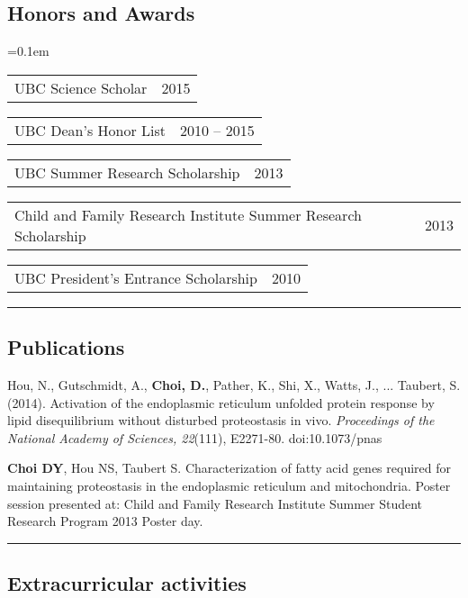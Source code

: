 \documentclass[10pt,letterpaper]{article}
\makeatletter
\newenvironment{indentsection}[1]%
{\begin{list}{}%
	{\setlength{\leftmargin}{#1}}%
	\item[]%
}
{\end{list}}
\newcommand{\headerrow}[2]
{\begin{tabular*}{\linewidth}{l@{\extracolsep{\fill}}r}
	#1 &
	#2 \\
\end{tabular*}}
\makeatother
\begin{document}
\subsection*{Honors and Awards}

\begin{itemize*}
	\parskip=0.1em
	\item 
	\headerrow
		{{UBC Science Scholar}}
		{{2015}}
	\item 
	\headerrow
		{{UBC Dean's Honor List}}
		{{2010 -- 2015}}
	\item 
	\headerrow
		{{UBC Summer Research Scholarship}}
		{{2013}}
	\item 
	\headerrow
		{{Child and Family Research Institute Summer Research Scholarship}}
		{{2013}}
	\item 
	\headerrow
		{{UBC President's Entrance Scholarship}}
		{{2010}}
\end{itemize*}


\hrule
\vspace{-0.4em}

\subsection*{Publications}

\begin{indentsection}{\parindent}
\begin{description*}
	\item
	Hou, N., Gutschmidt, A., \textbf{Choi, D.}, Pather, K., Shi, X., Watts, J., ... Taubert, S. 
	(2014). Activation of the endoplasmic reticulum unfolded protein response by 
	lipid disequilibrium without disturbed proteostasis in vivo. \textit{Proceedings of the 
	National Academy of Sciences, 22}(111), E2271-80. doi:10.1073/pnas
	\item
	\textbf{Choi DY}, Hou NS, Taubert S. Characterization of fatty acid genes required for 
	maintaining proteostasis in the endoplasmic reticulum and mitochondria. Poster 
	session presented at: Child and Family Research Institute Summer Student Research 
	Program 2013 Poster day.
\end{description*}
\end{indentsection}
\hrule
\vspace{-0.4em}

\subsection*{Extracurricular activities}
\end{document}
